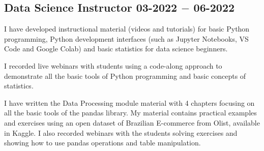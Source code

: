 \subsection{{Data Science Instructor \hfill 03-2022 $-$ 06-2022}}
\begin{zitemize}
\item I have developed instructional material (videos and tutorials) for basic Python programming, Python development interfaces (such as Jupyter Notebooks, VS Code and Google Colab) 
and basic statistics for data science beginners.
\item I recorded live webinars with students using a code-along approach to demonstrate all the basic tools of Python programming and basic concepts of statistics.
\item I have written the Data Processing module material with 4 chapters focusing on all the basic tools of the pandas library. My material contains practical examples 
and exercises using an open dataset of Brazilian E-commerce from Olist, available in Kaggle. I also recorded webinars with the students solving exercises 
and showing how to use pandas operations and table manipulation.
\end{zitemize}

